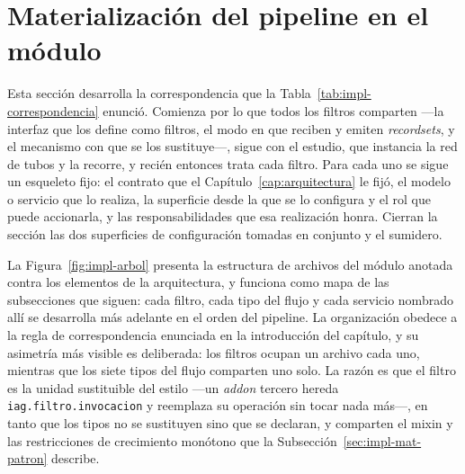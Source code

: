 \documentclass[12pt]{report}
\begin{document}
\section{Materialización del pipeline en el módulo}
\label{sec:impl-materializacion}




Esta sección desarrolla la correspondencia que la Tabla~\ref{tab:impl-correspondencia} enunció. Comienza por lo que todos los filtros comparten ---la interfaz que los define como filtros, el modo en que reciben y emiten \textit{recordsets}, y el mecanismo con que se los sustituye---, sigue con el estudio, que instancia la red de tubos y la recorre, y recién entonces trata cada filtro. Para cada uno se sigue un esqueleto fijo: el contrato que el Capítulo~\ref{cap:arquitectura} le fijó, el modelo o servicio que lo realiza, la superficie desde la que se lo configura y el rol que puede accionarla, y las responsabilidades que esa realización honra. Cierran la sección las dos superficies de configuración tomadas en conjunto y el sumidero.

La Figura~\ref{fig:impl-arbol} presenta la estructura de archivos del módulo anotada contra los elementos de la arquitectura, y funciona como mapa de las subsecciones que siguen: cada filtro, cada tipo del flujo y cada servicio nombrado allí se desarrolla más adelante en el orden del pipeline. La organización obedece a la regla de correspondencia enunciada en la introducción del capítulo, y su asimetría más visible es deliberada: los filtros ocupan un archivo cada uno, mientras que los siete tipos del flujo comparten uno solo. La razón es que el filtro es la unidad sustituible del estilo ---un \textit{addon} tercero hereda \texttt{iag.filtro.invocacion} y reemplaza su operación sin tocar nada más---, en tanto que los tipos no se sustituyen sino que se declaran, y comparten el mixin y las restricciones de crecimiento monótono que la Subsección~\ref{sec:impl-mat-patron} describe.
\end{document}
